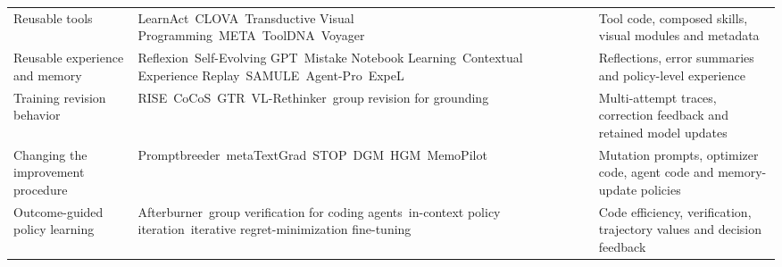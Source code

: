 \begin{longtable}{@{}>{\raggedright\arraybackslash}p{}>{\raggedright\arraybackslash}p{}>{\raggedright\arraybackslash}p{}@{}}
\addlinespace[8pt]
Reusable tools & LearnAct~\citep{zhao2024empowering}\newline CLOVA~\citep{Gao_2024_CVPR}\newline Transductive Visual Programming~\citep{wu2026transductive}\newline META~\citep{Huang2026meta}\newline ToolDNA~\citep{ai-etal-2026-tooldna}\newline Voyager~\citep{wang2024voyager} & Tool code, composed skills, visual modules and metadata \\
\addlinespace[8pt]
Reusable experience and memory & Reflexion~\citep{shinn2023reflexion}\newline Self-Evolving GPT~\citep{gao-etal-2024-self-evolving}\newline Mistake Notebook Learning~\citep{su-etal-2026-mistake}\newline Contextual Experience Replay~\citep{liu-etal-2025-contextual}\newline SAMULE~\citep{ge-etal-2025-samule}\newline Agent-Pro~\citep{zhang-etal-2024-agent}\newline ExpeL~\citep{DBLP:conf/aaai/Zhao0XLLH24} & Reflections, error summaries and policy-level experience \\
\addlinespace[8pt]
Training revision behavior & RISE~\citep{qu2024recursive}\newline CoCoS~\citep{cho-etal-2025-self}\newline GTR~\citep{Wei_2025_ICCV}\newline VL-Rethinker~\citep{wang2025vlrethinker}\newline group revision for grounding~\citep{Liu2026failure} & Multi-attempt traces, correction feedback and retained model updates \\
\addlinespace[8pt]
Changing the improvement procedure & Promptbreeder~\citep{pmlr-v235-fernando24a}\newline metaTextGrad~\citep{xu2025metatextgrad}\newline STOP~\citep{zelikman2024selftaught}\newline DGM~\citep{zhang2026darwin}\newline HGM~\citep{wang2026huxleygodel}\newline MemoPilot~\citep{cai2026from} & Mutation prompts, optimizer code, agent code and memory-update policies \\
\addlinespace[8pt]
Outcome-guided policy learning & Afterburner~\citep{du2025afterburner}\newline group verification for coding agents~\citep{dai2026group}\newline in-context policy iteration~\citep{brooks2023large}\newline iterative regret-minimization fine-tuning~\citep{park2026posttraining} & Code efficiency, verification, trajectory values and decision feedback \\

\end{longtable}
